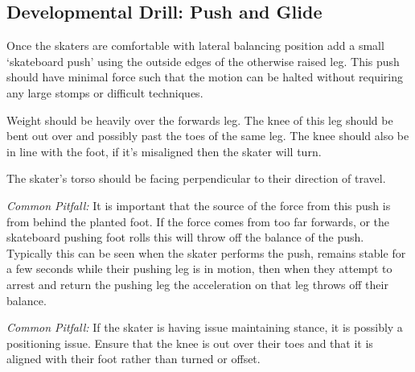 \subsection*{Developmental Drill: Push and Glide}
\label{drill:lateral/developmental/push_and_glide}

Once the skaters are comfortable with lateral balancing position add a small `skateboard push' using the outside edges of the otherwise raised leg.
This push should have minimal force such that the motion can be halted without requiring any large stomps or difficult techniques.    

Weight should be heavily over the forwards leg. 
The knee of this leg should be bent out over and possibly past the toes of the same leg.
The knee should also be in line with the foot, if it's misaligned then the skater will turn.

The skater's torso should be facing perpendicular to their direction of travel.


{\it Common Pitfall:}
It is important that the source of the force from this push is from behind the planted foot.
If the force comes from too far forwards, or the skateboard pushing foot rolls this will throw off the balance of the push.
Typically this can be seen when the skater performs the push, remains stable for a few seconds while their pushing leg is in motion, then when they attempt to arrest and return the pushing leg the acceleration on that leg throws off their balance. 


{\it Common Pitfall:}
If the skater is having issue maintaining stance, it is possibly a positioning issue. Ensure that the knee is out over their toes and that it is aligned with their foot rather than turned or offset. 

